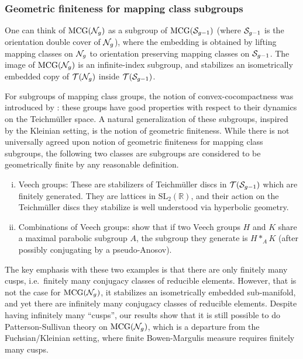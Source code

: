 
\subsubsection*{Geometric finiteness for mapping class subgroups}

One can think of $\mathrm{MCG}(\mathcal{N}_g)$ as a subgroup of $\mathrm{MCG}(\mathcal{S}_{g-1})$ (where $\mathcal{S}_{g-1}$ is the orientation double cover of $\mathcal{N}_g$), where the embedding is obtained by lifting mapping classes on $\mathcal{N}_g$ to orientation preserving mapping classes on $\mathcal{S}_{g-1}$.
The image of $\mathrm{MCG}(\mathcal{N}_g)$ is an infinite-index subgroup, and stabilizes an isometrically embedded copy of $\mathcal{T}(\mathcal{N}_g)$ inside $\mathcal{T}(\mathcal{S}_{g-1})$.

For subgroups of mapping class groups, the notion of convex-cocompactness was introduced by \textcite{farb2002convex}: these groups have good properties with respect to their dynamics on the Teichmüller space.
A natural generalization of these subgroups, inspired by the Kleinian setting, is the notion of geometric finiteness.
While there is not universally agreed upon notion of geometric finiteness for mapping class subgroups, the following two classes are subgroups are considered to be geometrically finite by any reasonable definition.

\begin{enumerate}[(i)]
\item Veech groups: These are stabilizers of Teichmüller discs in $\mathcal{T}(\mathcal{S}_{g-1})$ which are finitely generated.
  They are lattices in $\mathrm{SL}_2(\mathbb{R})$, and their action on the Teichmüller discs they stabilize is well understood via hyperbolic geometry.
\item Combinations of Veech groups: \textcite{leininger2006combination} show that if two Veech groups $H$ and $K$ share a maximal parabolic subgroup $A$, the subgroup they generate is $H \ast_A K$ (after possibly conjugating by a pseudo-Anosov).
\end{enumerate}

The key emphasis with these two examples is that there are only finitely many cusps, i.e.\ finitely many conjugacy classes of reducible elements.
However, that is not the case for $\mathrm{MCG}(\mathcal{N}_g)$, it stabilizes an isometrically embedded sub-manifold, and yet there are infinitely many conjugacy classes of reducible elements.
Despite having infinitely many ``cusps'', our results show that it is still possible to do Patterson-Sullivan theory on $\mathrm{MCG}(\mathcal{N}_g)$, which is a departure from the Fuchsian/Kleinian setting, where finite Bowen-Margulis measure requires finitely many cusps.

